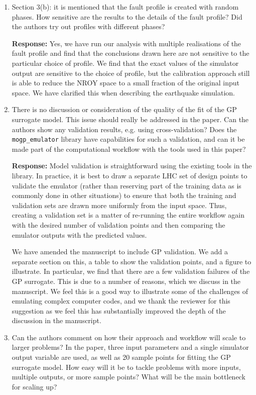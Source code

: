 \documentclass{article}
\begin{document}
\begin{enumerate}
\item Section 3(b): it is mentioned that the fault profile is created with random phases. How sensitive are the results to the details of the fault profile? Did the authors try out profiles with different phases?

  \textbf{Response:} Yes, we have run our analysis with multiple realisations
  of the fault profile and find that the conclusions drawn here are not
  sensitive to the particular choice of profile. We find that the exact
  values of the simulator output are sensitive to the choice of profile,
  but the calibration approach still is able to reduce the NROY space to
  a small fraction of the original input space. We have clarified this
  when describing the earthquake simulation.

\item There is no discussion or consideration of the quality of the fit of the GP surrogate model. This issue should really be addressed in the paper. Can the authors show any validation results, e.g. using cross-validation? Does the \texttt{mogp\_emulator} library have capabilities for such a validation, and can it be made part of the computational workflow with the tools used in this paper?

  \textbf{Response:} Model validation is straightforward using the existing
  tools in the library. In practice, it is best to draw a separate LHC set
  of design points to validate the emulator (rather than reserving part
  of the training data as is commonly done in other situations) to ensure
  that both the training and validation sets are drawn more uniformly from
  the input space. Thus, creating a validation set is a matter of re-running
  the entire workflow again with the desired number of validation points
  and then comparing the emulator outputs with the predicted values.

  We have amended the manuscript to include GP validation. We add a separate
  section on this, a table to show the validation points, and a figure to
  illustrate. In particular,
  we find that there are a few validation failures of the GP surrogate.
  This is due to a number of reasons, which we discuss in the manuscript.
  We feel this is a good way to illustrate some of the challenges of
  emulating complex computer codes, and we thank the reviewer for this
  suggestion as we feel this has substantially improved the depth of
  the discussion in the manuscript.

\item Can the authors comment on how their approach and workflow will scale to larger problems? In the paper, three input parameters and a single simulator output variable are used, as well as 20 sample points for fitting the GP surrogate model. How easy will it be to tackle problems with more inputs, multiple outputs, or more sample points? What will be the main bottleneck for scaling up?


\end{enumerate}
\end{document}
